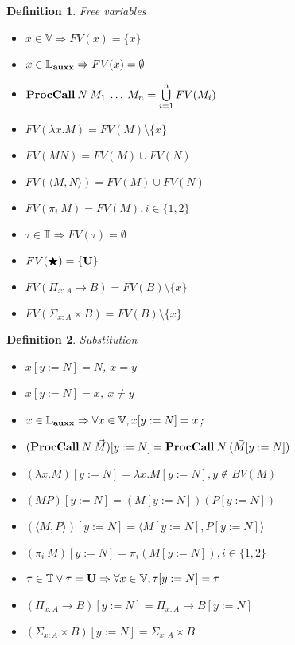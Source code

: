 \documentclass[a4paper]{article}
\newtheorem{defin}{Definition}
\begin{document}
\begin{defin} Free variables

  \begin{itemize}
    \item $x \in \mathbb{V} \Rightarrow FV(x) = \{ x \}$
    \item $x \in \mathbb{L}_{\bf auxx} \Rightarrow FV(x) = \emptyset$
    \item ${\bf ProcCall \:} N \: M_1 \: \dots \: M_n = \bigcup \limits_{i = 1}^n FV(M_i)$
    \item $FV(\lambda x. M) = FV(M) \setminus \{ x \}$
    \item $FV(M N) = FV(M) \cup FV(N)$
    \item $FV(\langle M , N \rangle) = FV(M) \cup FV(N)$
    \item $FV (\pi_i \: M) = FV(M), i \in \{ 1, 2\}$
    \item $\tau \in \mathbb{T} \Rightarrow FV (\tau) = \emptyset$
    \item $FV (\bigstar) = \{ {\bf U} \}$
    \item $FV(\Pi_{x : A} \to B) = FV(B) \setminus \{ x \}$
    \item $FV(\Sigma_{x : A} \times B) = FV(B) \setminus \{ x \}$
  \end{itemize}
\end{defin}

\begin{defin} Substitution
  \begin{itemize}
    \item $x [y := N] = N$, $x = y$
    \item $x [y := N] = x$, $x \neq y$
    \item $x \in \mathbb{L}_{\bf auxx} \Rightarrow \forall x \in \mathbb{V}, x [y := N] = x$;
    \item $({\bf ProcCall \:} N \: \vec{M}) [y := N] = {\bf ProcCall \:} N \: (\vec{M} [y := N])$
    \item $(\lambda x. M) [y := N] = \lambda x. M [y := N], y \notin BV(M)$
    \item $(M P) [y := N] = (M [y := N]) (P [y := N])$
    \item $(\langle M , P \rangle) [y := N] = \langle M [y := N], P [y := N] \rangle$
    \item $(\pi_i \: M) [y := N] = \pi_i (M [y := N]), i \in \{ 1, 2\}$
    \item $\tau \in \mathbb{T} \vee \tau = {\bf U} \Rightarrow \forall x \in \mathbb{V}, \tau [y := N] = \tau$
    \item $(\Pi_{x : A} \to B) [y := N] = \Pi_{x : A} \to B [y := N]$
    \item $(\Sigma_{x : A} \times B) [y := N] = \Sigma_{x : A} \times B$
  \end{itemize}
\end{defin}
\end{document}
